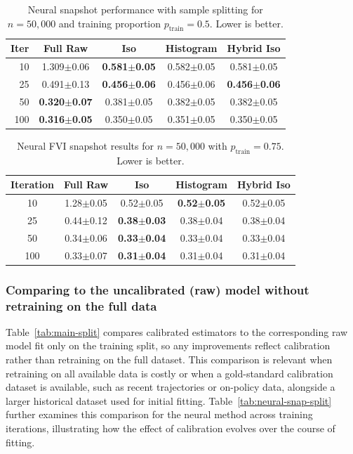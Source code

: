 \documentclass{article}
\theoremstyle{plain}
\theoremstyle{definition}
\theoremstyle{remark}
\begin{document}
\begin{table}[h]
\centering
\small
\begin{tabular}{r cccc}
\toprule
Iter & Full Raw & Iso & Histogram & Hybrid Iso \\
\midrule
10  & 1.309$\pm$0.06 & \textbf{0.581$\pm$0.05} & 0.582$\pm$0.05 & 0.581$\pm$0.05 \\
25  & 0.491$\pm$0.13 & \textbf{0.456$\pm$0.06} & 0.456$\pm$0.06 & \textbf{0.456$\pm$0.06} \\
50  & \textbf{0.320$\pm$0.07} & 0.381$\pm$0.05 & 0.382$\pm$0.05 & 0.382$\pm$0.05 \\
100 & \textbf{0.316$\pm$0.05} & 0.350$\pm$0.05 & 0.351$\pm$0.05 & 0.350$\pm$0.05 \\
\bottomrule
\end{tabular}
\caption{Neural snapshot performance with sample splitting for \(n=50{,}000\) and training proportion \(p_{\mathrm{train}}=0.5\). Lower is better.}
\label{tab:neural-snap-split-50k-p05}
\end{table}

\begin{table}[h]
\centering
\small
\begin{tabular}{c cccc}
\toprule
Iteration & Full Raw & Iso & Histogram & Hybrid Iso \\
\midrule
10  & 1.28$\pm$0.05 & 0.52$\pm$0.05 & \textbf{0.52$\pm$0.05} & 0.52$\pm$0.05 \\
25  & 0.44$\pm$0.12 & \textbf{0.38$\pm$0.03} & 0.38$\pm$0.04 & 0.38$\pm$0.04 \\
50  & 0.34$\pm$0.06 & \textbf{0.33$\pm$0.04} & 0.33$\pm$0.04 & 0.33$\pm$0.04 \\
100 & 0.33$\pm$0.07 & \textbf{0.31$\pm$0.04} & 0.31$\pm$0.04 & 0.31$\pm$0.04 \\
\bottomrule
\end{tabular}
\caption{Neural FVI snapshot results for \(n=50{,}000\) with \(p_{\mathrm{train}}=0.75\). Lower is better.}
\label{tab:neural-snapshots-50k-ptrain-075}
\end{table}


 


\subsubsection{Comparing to the uncalibrated (raw) model without retraining on the full data}
Table~\ref{tab:main-split} compares calibrated estimators to the corresponding raw model fit only on the training split, so any improvements reflect calibration rather than retraining on the full dataset. This comparison is relevant when retraining on all available data is costly or when a gold-standard calibration dataset is available, such as recent trajectories or on-policy data, alongside a larger historical dataset used for initial fitting. Table~\ref{tab:neural-snap-split} further examines this comparison for the neural method across training iterations, illustrating how the effect of calibration evolves over the course of fitting.
\end{document}

